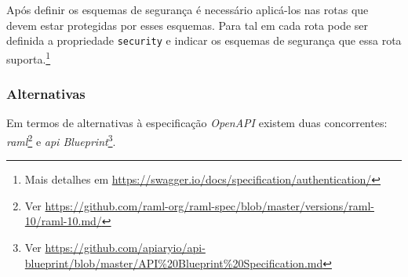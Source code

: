 Após definir os esquemas de segurança é necessário aplicá-los nas rotas que devem estar protegidas 
por esses esquemas. Para tal em cada rota pode ser definida a propriedade \texttt{security} e indicar 
os esquemas de segurança que essa rota 
suporta.\footnote{Mais detalhes em \url{https://swagger.io/docs/specification/authentication/}}

\subsubsection{Alternativas}
Em termos de alternativas à especificação \textit{OpenAPI} existem duas 
concorrentes: \textit{\acrshort{raml}}\footnote{Ver \url{https://github.com/raml-org/raml-spec/blob/master/versions/raml-10/raml-10.md/}} e \textit{\acrshort{api} Blueprint}\footnote{Ver \url{https://github.com/apiaryio/api-blueprint/blob/master/API\%20Blueprint\%20Specification.md}}.

